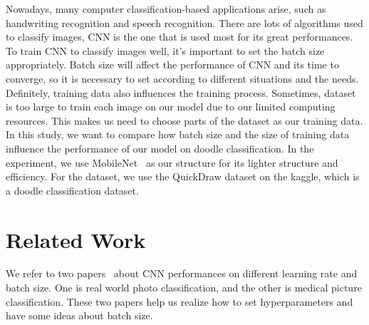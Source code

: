 \documentclass[10pt,twocolumn,letterpaper]{article}
\begin{document}


Nowadays, many computer classification-based applications arise, such as handwriting recognition and speech recognition.
There are lots of algorithms used to classify images, CNN is the one that is used most for its great performances.
To train CNN to classify images well, it's important to set the batch size appropriately.
Batch size will affect the performance of CNN and its time to converge, so it is necessary to set according to different situations and the needs.~\cite{BATCHSIZE}
Definitely, training data also influences the training process.
Sometimes, dataset is too large to train each image on our model due to our limited computing resources.
This makes us need to choose parts of the dataset as our training data.
In this study, we want to compare how batch size and the size of training data influence the performance of our model on doodle classification.
In the experiment, we use MobileNet~\cite{MobileNet} as our structure for its lighter structure and efficiency.
For the dataset, we use the QuickDraw dataset on the kaggle, which is a doodle classification dataset.


\section{Related Work}
We refer to two papers~\cite{BATCHSIZE,Medical} about CNN performances on different learning rate and batch size. 
One is real world photo classification, and the other is medical picture classification.
These two papers help us realize how to set hyperparameters and have some ideas about batch size.\\
\end{document}
